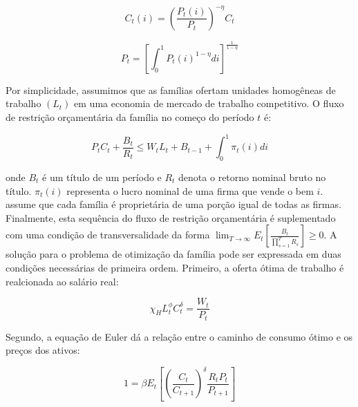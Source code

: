 \documentclass[twoside,a4paper,11pt]{report}
\begin{document}
\begin{equation}\label{eq03en02}
{ C }_{ t }(i)={ \left( \frac { { P }_{ t }(i) }{ { P }_{ t } }  \right)  }^{ -\eta  }{ C }_{ t }
\end{equation}

\begin{equation}\label{eq04en02}
{ P }_{ t }={ \left[ \int _{ 0 }^{ 1 }{ { P }_{ t }{ (i) }^{ 1-\eta  } } di \right]  }^{ \frac { 1 }{ 1-\eta  }  }
\end{equation}

Por simplicidade, assumimos que as famílias ofertam unidades homogêneas de trabalho $(L_{t})$ em uma economia de mercado de trabalho competitivo. O fluxo de restrição orçamentária da família no começo do período $t$ é:

\begin{equation}\label{eq05en02}
{ P }_{ t }{ C }_{ t }+\frac { { B }_{ t } }{ { R }_{ t } } \le { W }_{ t }{ L }_{ t }+{ B }_{ t-1 }+\int _{ 0 }^{ 1 }{ { \pi  }_{ t }(i)di } 
\end{equation}

\noindent onde ${ B }_{ t }$ é um título de um período e $R_{t}$ denota o retorno nominal bruto no título. ${ \pi  }_{ t }(i)$ representa o lucro nominal de uma firma que vende o bem $i$. \citet{yao2010aggregate} assume que cada família é proprietária de uma porção igual de todas as firmas. Finalmente, esta sequência do fluxo de restrição orçamentária é suplementado com uma condição de transversalidade da forma $\lim _{ T\rightarrow \infty  }{ { E }_{ t }\left[ \frac { { B }_{ t } }{ \prod _{ s=1 }^{ T }{ R_{ s } }  }  \right]  } \ge 0$. A solução para o problema de otimização da família pode ser expressada em duas condições necessárias de primeira ordem. Primeiro, a oferta ótima de trabalho é realcionada ao salário real:

\begin{equation}\label{eq06en02}
{ \chi  }_{ H }{ L }_{ t }^{ \phi  }{ C }_{ t }^{ \delta  }=\frac { { W }_{ t } }{ { P }_{ t } } 
\end{equation}

Segundo, a equação de Euler dá a relação entre o caminho de consumo ótimo e os preços dos ativos:

\begin{equation}\label{eq07en02}
1=\beta { E }_{ t }\left[ { \left( \frac { { C }_{ t } }{ { C }_{ t+1 } }  \right)  }^{ \delta  }\frac { { R }_{ t }{ P }_{ t } }{ { P }_{ t+1 } }  \right] 
\end{equation}
\end{document}
